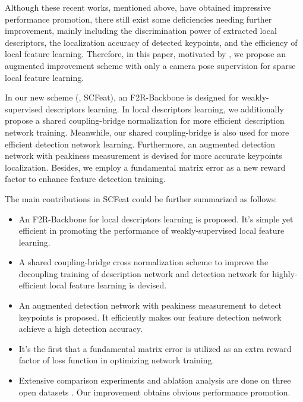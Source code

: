 \documentclass[journal]{IEEEtran}
\begin{document}
Although these recent works, mentioned above, have obtained impressive performance promotion, there still exist some deficiencies needing further improvement, mainly including the discrimination power of extracted local descriptors, the localization accuracy of detected keypoints, and the efficiency of local feature learning. Therefore, in this paper, motivated by \cite{li2022decoupling,caps,cndesc,aslfeat}, we propose an augmented improvement scheme with only a camera pose supervision for sparse local feature learning. 

In our new scheme (, SCFeat), an F2R-Backbone is designed for weakly-supervised descriptors learning. In local descriptors learning, we additionally propose a shared coupling-bridge normalization for more efficient description network training. Meanwhile, our shared coupling-bridge is also used for more efficient detection network learning. Furthermore, an augmented detection network with peakiness measurement is devised for more accurate keypoints localization.
Besides, we employ a fundamental matrix error as a new reward factor to enhance feature detection training. 


The main contributions in SCFeat could be further summarized as follows:
\begin{itemize}
\item{An F2R-Backbone for local descriptors learning is proposed. It's simple yet efficient in promoting the performance of weakly-supervised local feature learning.}

\item{A shared coupling-bridge cross normalization scheme to improve the decoupling training of description network and detection network for highly-efficient local feature learning is devised.}

\item{An augmented detection network with peakiness measurement to detect keypoints is proposed. It efficiently makes our feature detection network achieve a high detection accuracy.}

\item{It's the first that a fundamental matrix error is utilized as an extra reward factor of loss function in optimizing network training.}

\item{Extensive comparison experiments and ablation analysis are done on three open datasets \cite{HPatches,aachen,ETH}. Our improvement obtains obvious performance promotion.}
\end{itemize}
\end{document}
